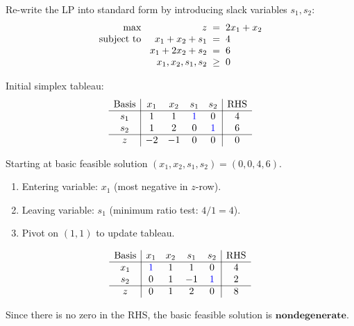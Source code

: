 \documentclass[a4paper, 10pt]{article}
\begin{document}
\begin{solution}
Re-write the LP into standard form by introducing slack variables \(s_1, s_2\):
\[
\begin{array}{@{\hspace{2mm}} r @{\hspace{2mm}} r @{\hspace{2mm}} c @{\hspace{2mm}} l}
    \text{max } & z & = & 2x_1 + x_2 \\
    \text{subject to } & x_1 + x_2 + s_1 & = & 4 \\
    & x_1 + 2x_2 + s_2 & = & 6 \\
    & x_1, x_2, s_1, s_2 & \geq & 0
\end{array}
\]

Initial simplex tableau:
\[
\begin{array}{c|cccc|c}
    \text{Basis} & x_1 & x_2 & s_1 & s_2 & \text{RHS} \\
    \hline
    s_1 & 1 & 1 & \textcolor[HTML]{0000FF}{1} & 0 & 4 \\
    s_2 & 1 & 2 & 0 & \textcolor[HTML]{0000FF}{1} & 6 \\
    \hline
    z & -2 & -1 & 0 & 0 & 0 \\
\end{array}
\]

Starting at basic feasible solution \( (x_1, x_2, s_1, s_2) = (0, 0, 4, 6) \).
\begin{enumerate}
    \item Entering variable: \( x_1 \) (most negative in \( z \)-row).
    \item Leaving variable: \( s_1 \) (minimum ratio test: \( 4/1 = 4 \)).
    \item Pivot on \( (1,1) \) to update tableau.
\end{enumerate}
\[
\begin{array}{c|cccc|c}
    \text{Basis} & x_1 & x_2 & s_1 & s_2 & \text{RHS} \\
    \hline
    x_1 & \textcolor[HTML]{0000FF}{1} & 1 & 1 & 0 & 4 \\
    s_2 & 0 & 1 & -1 & \textcolor[HTML]{0000FF}{1} & 2 \\
    \hline
    z & 0 & 1 & 2 & 0 & 8 \\
\end{array}
\]

Since there is no zero in the RHS, the basic feasible solution is \( \boxed{\textbf{nondegenerate}} \).
\end{solution}
\end{document}
